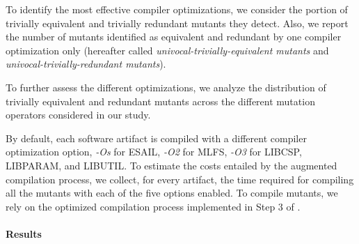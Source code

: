 To identify the most effective compiler optimizations, we consider the portion of trivially equivalent and trivially redundant mutants they detect. Also, we report the number of mutants identified as equivalent and redundant  by one compiler optimization only (hereafter called \emph{univocal-trivially-equivalent mutants} and \emph{univocal-trivially-redundant mutants}). 

{To further assess the different optimizations, we analyze the distribution of trivially equivalent and redundant mutants across the different mutation operators considered in our study.}

{By default, each software artifact is compiled with a different compiler optimization option, \emph{-Os} for ESAIL, \emph{-O2} for MLFS, \emph{-O3} for LIBCSP, LIBPARAM, and LIBUTIL.}
To estimate the costs entailed by the augmented compilation process, we collect, for every artifact, the time required for compiling all the mutants with each of the five options enabled. To compile mutants, we rely on the optimized compilation process implemented in Step 3 of \APPR.

\paragraph{Results}




